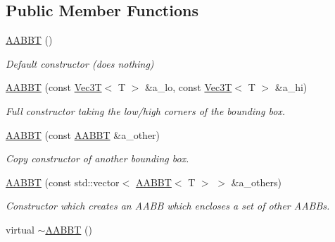 \subsection*{Public Member Functions}
\begin{DoxyCompactItemize}
\item 
\mbox{\label{classEBGeometry_1_1BoundingVolumes_1_1AABBT_af14582b583b097dd7d2888812dc7027f}} 
\hyperlink{classEBGeometry_1_1BoundingVolumes_1_1AABBT_af14582b583b097dd7d2888812dc7027f}{A\+A\+B\+BT} ()
\begin{DoxyCompactList}\small\item\em Default constructor (does nothing) \end{DoxyCompactList}\item 
\hyperlink{classEBGeometry_1_1BoundingVolumes_1_1AABBT_a14344a09e9c31143fe819c768518d974}{A\+A\+B\+BT} (const \hyperlink{classVec3T}{Vec3T}$<$ T $>$ \&a\+\_\+lo, const \hyperlink{classVec3T}{Vec3T}$<$ T $>$ \&a\+\_\+hi)
\begin{DoxyCompactList}\small\item\em Full constructor taking the low/high corners of the bounding box. \end{DoxyCompactList}\item 
\hyperlink{classEBGeometry_1_1BoundingVolumes_1_1AABBT_a41e688e21ed4f112d18a00c2f866de5b}{A\+A\+B\+BT} (const \hyperlink{classEBGeometry_1_1BoundingVolumes_1_1AABBT}{A\+A\+B\+BT} \&a\+\_\+other)
\begin{DoxyCompactList}\small\item\em Copy constructor of another bounding box. \end{DoxyCompactList}\item 
\hyperlink{classEBGeometry_1_1BoundingVolumes_1_1AABBT_a1298160e99352a0359892b11edcfd01f}{A\+A\+B\+BT} (const std\+::vector$<$ \hyperlink{classEBGeometry_1_1BoundingVolumes_1_1AABBT}{A\+A\+B\+BT}$<$ T $>$ $>$ \&a\+\_\+others)
\begin{DoxyCompactList}\small\item\em Constructor which creates an A\+A\+BB which encloses a set of other A\+A\+B\+Bs. \end{DoxyCompactList}\item 
\mbox{\label{classEBGeometry_1_1BoundingVolumes_1_1AABBT_a918cbae4494608b8dfebe07a1c595f08}} 
virtual \hyperlink{classEBGeometry_1_1BoundingVolumes_1_1AABBT_a918cbae4494608b8dfebe07a1c595f08}{$\sim$\+A\+A\+B\+BT} ()

\end{DoxyCompactItemize}
